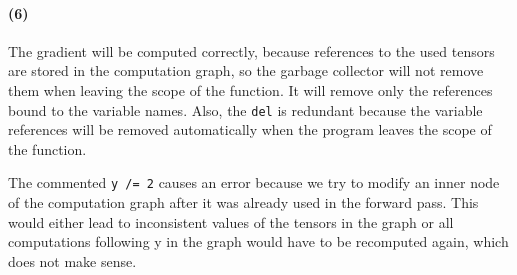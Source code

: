 \documentclass[a4paper,11pt]{article}
\begin{document}
\paragraph{(6)} The gradient will be computed correctly, because references to the used tensors are stored in the computation graph, so the garbage collector will not remove them when leaving the scope of the function.
It will remove only the references bound to the variable names.
Also, the \texttt{del} is redundant because the variable references will be removed automatically when the program leaves the scope of the function.

The commented \texttt{y /= 2} causes an error because we try to modify an inner node of the computation graph after it was already used in the forward pass.
This would either lead to inconsistent values of the tensors in the graph or all computations following y in the graph would have to be recomputed again, which does not make sense.
\end{document}
